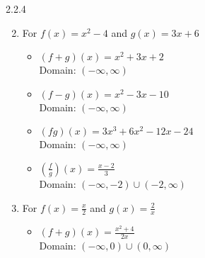 \begin{Answer}{2.2.4}
\begin{enumerate}
\begin{multicols}{2}
\begin{itemize}
			\end{itemize}

		\end{multicols}


		\item For $f(x) = x^2-4$ and $g(x) = 3x+6$

		\begin{multicols}{2}

			\begin{itemize}

				\item $(f+g)(x) = x^2+3x+2$ \\
				Domain: $(-\infty, \infty)$

				\vfill

				\columnbreak

				\item $(f-g)(x) = x^2-3x-10$ \\
				Domain:  $(-\infty, \infty)$


			\end{itemize}

		\end{multicols}

		\begin{multicols}{2}

			\begin{itemize}

				\item $(fg)(x) = 3x^3+6x^2-12x-24$ \\
				Domain: $(-\infty, \infty)$

				\vfill

				\columnbreak

				\item $\left(\frac{f}{g}\right)(x) = \frac{x-2}{3}$ \\
				Domain:  $\left(-\infty, -2 \right) \cup \left(-2, \infty \right)$


			\end{itemize}

		\end{multicols}

		\item For  $f(x) = \frac{x}{2}$ and $g(x) = \frac{2}{x}$

		\begin{multicols}{2}

			\begin{itemize}

				\item $(f+g)(x) = \frac{x^2+4}{2x}$ \\
				Domain: $(-\infty, 0) \cup (0, \infty)$


\end{itemize}
\end{multicols}
\end{enumerate}
\end{Answer}
